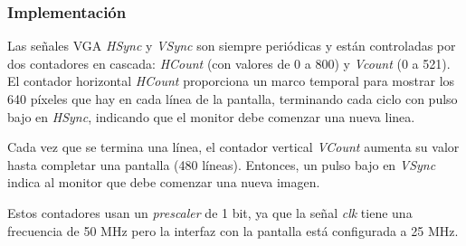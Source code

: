 \subsubsection{Implementación}

Las señales VGA \textit{HSync} y \textit{VSync} son siempre periódicas y están controladas por dos contadores en cascada: \textit{HCount} (con valores de 0 a 800) y \textit{Vcount} (0 a 521). El contador horizontal \textit{HCount} proporciona un marco temporal para mostrar los 640 píxeles que hay en cada línea de la pantalla, terminando cada ciclo con pulso bajo en \textit{HSync}, indicando que el monitor debe comenzar una nueva linea. 

Cada vez que se termina una línea, el contador vertical \textit{VCount} aumenta su valor hasta completar una pantalla (480 líneas). Entonces, un pulso bajo en \textit{VSync} indica al monitor que debe comenzar una nueva imagen.

Estos contadores usan un \emph{prescaler} de 1 bit, ya que la señal \textit{clk} tiene una frecuencia de 50 MHz pero la interfaz con la pantalla está configurada a 25 MHz.


